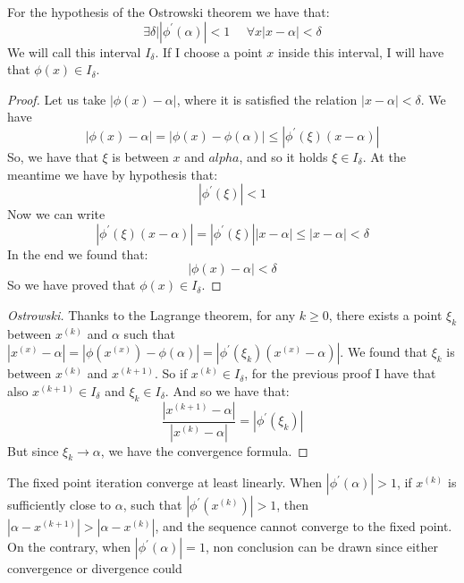 \documentclass[12pt, a4paper]{report}
\newtheorem[style=M,bodystyle=\normalfont]{theorem}{Theorem}
\newtheorem[style=M,bodystyle=\normalfont]{proposition}{Proposition}
\newtheorem[style=M,bodystyle=\normalfont]{corollary}{Corollary}
\newtheorem[style=M,bodystyle=\normalfont]{lemma}{Lemma}
\newtheorem[style=M,bodystyle=\normalfont]{definition}{Definition}
\begin{document}
    For the hypothesis of the Ostrowski theorem we have that: 
    \[\exists \delta | \left\lvert \phi^{'}(\alpha) \right\rvert < 1 \:\:\:\:\:\: \forall x \left\lvert x - \alpha \right\rvert < \delta\]
    We will call this interval $I_{\delta}$. If I choose a point $x$ inside this interval, I will have that $\phi(x) \in I_{\delta}$. 
    \begin{proof}
        Let us take $\left\lvert \phi(x)-\alpha \right\rvert$, where it is satisfied the relation $\left\lvert x- \alpha \right\rvert < \delta$. We have
        \[\left\lvert \phi(x)-\alpha \right\rvert=\left\lvert \phi(x)-\phi(\alpha) \right\rvert \leq \left\lvert \phi^{'}(\xi)(x-\alpha) \right\rvert \]
        So, we have that $\xi$ is between $x$ and $alpha$, and so it holds $\xi \in I_{\delta}$. At the meantime we have by hypothesis that: 
        \[\left\lvert \phi^{'}(\xi) \right\rvert < 1\]
        Now we can write 
        \[\left\lvert \phi^{'}(\xi)(x-\alpha) \right\rvert = \left\lvert \phi^{'}(\xi) \right\rvert \left\lvert x-\alpha \right\rvert \leq \left\lvert x-\alpha \right\rvert < \delta\]
        In the end we found that: 
        \[\left\lvert \phi(x)-\alpha \right\rvert < \delta\]
        So we have proved that $\phi(x) \in I_{\delta}$. 
    \end{proof}
    \begin{proof}[Ostrowski]
        Thanks to the Lagrange theorem, for any $k \geq 0$, there exists a point $\xi_k$ between $x^{(k)}$ and $\alpha$ such that $\left\lvert x^{(x)}-\alpha\right\rvert =
        \left\lvert \phi(x^{(x)})-\phi(\alpha)\right\rvert = \left\lvert \phi^{'}(\xi_k)(x^{(x)}-\alpha)\right\rvert $. We found that $\xi_k$ is between $x^{(k)}$ and $x^{(k+1)}$. 
        So if $x^{(k)} \in I_{\delta}$, for the previous proof I have that also $x^{(k+1)} \in I_{\delta}$ and $\xi_k \in I_{\delta}$. And so we have that: 
        \[\dfrac{\left\lvert x^{(k+1)}-\alpha\right\rvert }{\left\lvert x^{(k)}-\alpha\right\rvert }=\left\lvert \phi^{'}(\xi_k)\right\rvert \]
        But since $\xi_k \rightarrow \alpha$, we have the convergence formula. 
    \end{proof}
    The fixed point iteration converge at least linearly. When $\left\lvert \phi^{'}(\alpha) \right\rvert > 1$, if $x^{(k)}$ is sufficiently close to $\alpha$, such that 
    $\left\lvert \phi^{'}(x^{(k)}) \right\rvert > 1$, then $\left\lvert \alpha - x^{(k+1)} \right\rvert > \left\lvert \alpha - x^{(k)} \right\rvert$, and the sequence cannot 
    converge to the fixed point. On the contrary, when $\left\lvert \phi^{'}(\alpha) \right\rvert = 1$, non conclusion can be drawn since either convergence or divergence could 
\end{document}
